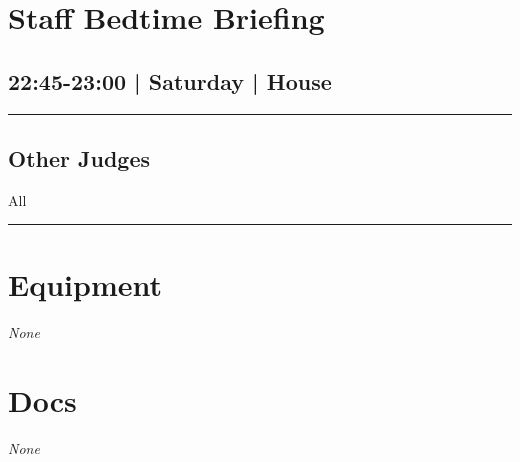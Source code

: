 \documentclass[10pt, A5]{article}
\begin{document}
        \begin{framed}
        \begin{minipage}{\textwidth}

        \setcounter{section}{48}
        \section{Staff Bedtime Briefing}
        \subsection*{22:45-23:00 | Saturday | House}

        \vspace{0.25cm}
        \hrule
        \vspace{0.25cm}


        \subsection*{Other Judges}
                    All

            \vspace{0.25cm}
        \hrule
        \vspace{0.25cm}

        \begin{multicols}{2}

		\section*{\faWrench \: Equipment}

				\textit{None}
		
		\vfill\null
		\columnbreak

			\section*{\faFile \: Docs}
		 	\textit{None}
	

		\vfill\null

		\end{multicols}
\end{minipage}
\end{framed}
\end{document}
